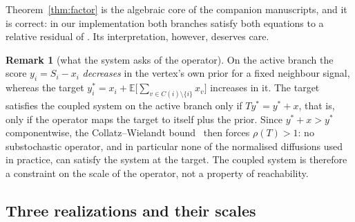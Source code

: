 \documentclass[11pt,a4paper]{article}
\theoremstyle{definition}
\newtheorem{remark}{Remark}
\theoremstyle{plain}
\newcommand{\E}{\mathbb{E}}
\begin{document}
Theorem~\ref{thm:factor} is the algebraic core of the companion manuscripts, and it is correct: in our implementation both branches satisfy both equations to a relative residual of \ThmResidual. Its interpretation, however, deserves care.

\begin{remark}[what the system asks of the operator]\label{rem:scale}
On the active branch the score $y_i=S_i-x_i$ \emph{decreases} in the vertex's own prior for a fixed neighbour signal, whereas the target $y^*_i=x_i+\E\big[\sum_{v\in C(i)\setminus\{i\}}x_v\big]$ increases in it. The target satisfies the coupled system on the active branch only if $Ty^*=y^*+x$, that is, only if the operator maps the target to itself plus the prior. Since $y^*+x>y^*$ componentwise, the Collatz--Wielandt bound~\cite{hornjohnson13} then forces $\rho(T)>1$: no substochastic operator, and in particular none of the normalised diffusions used in practice, can satisfy the system at the target. The coupled system is therefore a constraint on the scale of the operator, not a property of reachability.
\end{remark}

\subsection{Three realizations and their scales}\label{sec:realizations}
\end{document}
